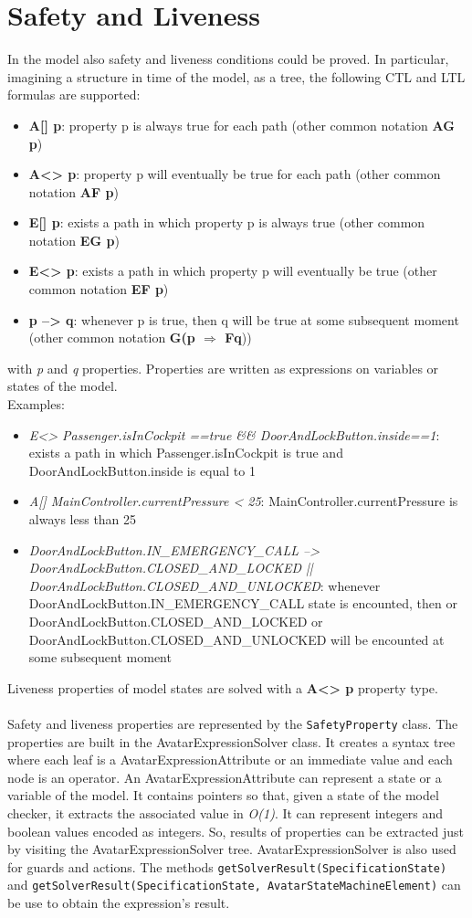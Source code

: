 \documentclass[12pt]{article}
\begin{document}
\section{Safety and Liveness}
In the model also safety and liveness conditions could be proved. In particular, imagining a structure in time of the model, as a tree, the following CTL and LTL formulas are supported:
\begin{itemize}
	\item \textbf{A[] p}: property p is always true for each path (other common notation \textbf{AG p})
	\item \textbf{A<> p}: property p will eventually be true for each path (other common notation \textbf{AF p})
	\item \textbf{E[] p}: exists a path in which property p is always true (other common notation \textbf{EG p})
	\item \textbf{E<> p}:  exists a path in which property p will eventually be true (other common notation \textbf{EF p})
	\item \textbf{p --> q}: whenever p is true, then q will be true at some subsequent moment (other common notation \textbf{G(p $\Rightarrow$ Fq}))
\end{itemize}
with \textit{p} and \textit{q} properties. Properties are written as expressions on variables or states of the model.\\
Examples:
\begin{itemize}
	\item \textit{E<> Passenger.isInCockpit ==true \&\& DoorAndLockButton.inside==1}: exists a path in which Passenger.isInCockpit is true and DoorAndLockButton.inside is equal to 1
	\item \textit{A[] MainController.currentPressure < 25}: MainController.currentPressure is always less than 25
	\item \textit{DoorAndLockButton.IN\_EMERGENCY\_CALL --> DoorAndLockButton.CLOSED\_AND\_LOCKED || DoorAndLockButton.CLOSED\_AND\_UNLOCKED}: whenever DoorAndLockButton.IN\_EMERGENCY\_CALL state is encounted, then or DoorAndLockButton.CLOSED\_AND\_LOCKED or DoorAndLockButton.CLOSED\_AND\_UNLOCKED will be encounted at some subsequent moment
\end{itemize}
Liveness properties of model states are solved with a \textbf{A<> p} property type.
\\\\
Safety and liveness properties are represented by the \texttt{SafetyProperty} class. The properties are built in the AvatarExpressionSolver class. It creates a syntax tree where each leaf is a AvatarExpressionAttribute or an immediate value and each node is an operator. An AvatarExpressionAttribute can represent a state or a variable of the model. It contains pointers so that, given a state of the model checker, it extracts the associated value in \textit{O(1)}. It can represent integers and boolean values encoded as integers. So, results of properties can be extracted just by visiting the AvatarExpressionSolver tree. AvatarExpressionSolver is also used for guards and actions. The methods \texttt{getSolverResult(SpecificationState)} and \texttt{getSolverResult(SpecificationState, AvatarStateMachineElement)} can be use to obtain the expression's result.
\end{document}
